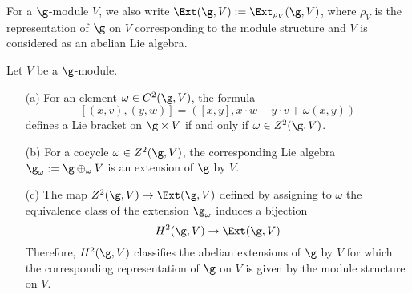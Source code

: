 For a $\g$-module $V$, we also write $\Ext(\g,V):=\Ext_{\rho_V}(\g,V)$, where $\rho_V$ is the representation of $\g$ on $V$ corresponding to the module structure and $V$ is considered as an abelian Lie algebra.
\begin{theorem}\label{Lie algebra cohomology H^2 extension char}
Let $V$ be a $\g$-module.
\begin{itemize}
\item[(a)] For an element $\omega\in C^2(\g,V)$, the formula
\[[(x,v),(y,w)]=([x,y],x\cdot w-y\cdot v+\omega(x,y))\]
defines a Lie bracket on $\g\times V$ if and only if $\omega\in Z^2(\g,V)$.
\item[(b)] For a cocycle $\omega\in Z^2(\g,V)$, the corresponding Lie algebra $\g_\omega:=\g\oplus_\omega V$ is an extension of $\g$ by $V$.
\item[(c)] The map $Z^2(\g,V)\to\Ext(\g,V)$ defined by assigning to $\omega$ the equivalence class of the extension $\g_\omega$ induces a bijection
\[H^2(\g,V)\to\Ext(\g,V)\]
Therefore, $H^2(\g,V)$ classifies the abelian extensions of $\g$ by $V$ for which the corresponding representation of $\g$ on $V$ is given by the module structure on $V$.
\end{itemize}
\end{theorem}
